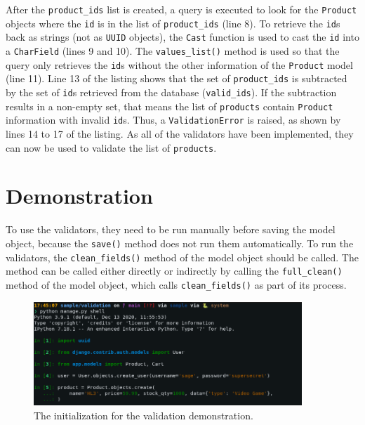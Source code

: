 After the \verb|product_ids| list is created, a query is executed to look for
the \verb|Product| objects where the \verb|id| is in the list of
\verb|product_ids| (line 8). To retrieve the \verb|id|s back as strings (not as
\verb|UUID| objects), the \verb|Cast| function is used to cast the \verb|id|
into a \verb|CharField| (lines 9 and 10). The \verb|values_list()| method is
used so that the query only retrieves the \verb|id|s without the other
information of the \verb|Product| model (line 11). Line 13 of the listing shows
that the set of \verb|product_ids| is subtracted by the set of \verb|id|s
retrieved from the database (\verb|valid_ids|). If the subtraction results in a
non-empty set, that means the list of \verb|products| contain \verb|Product|
information with invalid \verb|id|s. Thus, a \verb|ValidationError| is raised,
as shown by lines 14 to 17 of the listing. As all of the validators have been
implemented, they can now be used to validate the list of \verb|products|.

\section{Demonstration}

To use the validators, they need to be run manually before saving the model
object, because the \verb|save()| method does not run them automatically. To
run the validators, the \verb|clean_fields()| method of the model object should
be called. The method can be called either directly or indirectly by calling
the \verb|full_clean()| method of the model object, which calls
\verb|clean_fields()| as part of its process.

\begin{figure}
	\centering
    \includegraphics[width=0.90\textwidth]{pics/validation0.png}
	\caption{The initialization for the validation demonstration.}
	\label{fig:validation0}
\end{figure}

